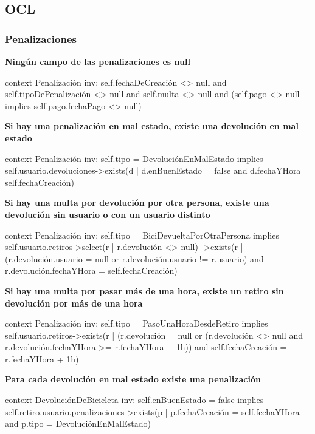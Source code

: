 \documentclass[a4paper, 10pt, twoside]{article}
\newenvironment{ocl}[1]
  {
    \textbf{#1}
    \verbatim
  }{
    \endverbatim
  }
\begin{document}
\subsection{OCL}


\subsubsection{Penalizaciones}

\begin{ocl}{Ningún campo de las penalizaciones es null}
  context Penalización
  inv: self.fechaDeCreación <> null and
       self.tipoDePenalización <> null and
       self.multa <> null and
       (self.pago <> null implies self.pago.fechaPago <> null)
\end{ocl}

\begin{ocl}{Si hay una penalización en mal estado, existe una devolución en mal estado}
  context Penalización
  inv: self.tipo = DevoluciónEnMalEstado implies self.usuario.devoluciones->exists(d |
           d.enBuenEstado = false and d.fechaYHora = self.fechaCreación)
\end{ocl}

\begin{ocl}{Si hay una multa por devolución por otra persona, existe una devolución sin usuario o con un usuario distinto}
  context Penalización
  inv: self.tipo = BiciDevueltaPorOtraPersona implies
           self.usuario.retiros->select(r | r.devolución <> null)
                               ->exists(r | (r.devolución.usuario = null or
                                             r.devolución.usuario != r.usuario) and
                                            r.devolución.fechaYHora = self.fechaCreación)
\end{ocl}

\begin{ocl}{Si hay una multa por pasar más de una hora, existe un retiro sin devolución por más de una hora}
  context Penalización
  inv: self.tipo = PasoUnaHoraDesdeRetiro implies self.usuario.retiros->exists(r |
           (r.devolución = null or (r.devolución <> null and
                                    r.devolución.fechaYHora >= r.fechaYHora + 1h)) and
           self.fechaCreación = r.fechaYHora + 1h)
\end{ocl}

\begin{ocl}{Para cada devolución en mal estado existe una penalización}
  context DevoluciónDeBicicleta
  inv: self.enBuenEstado = false implies
           self.retiro.usuario.penalizaciones->exists(p |
               p.fechaCreación = self.fechaYHora and
               p.tipo = DevoluciónEnMalEstado)
\end{ocl}
\end{document}
